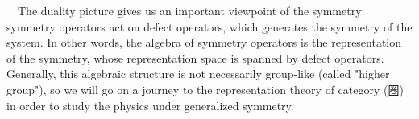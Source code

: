 \documentclass{ltjsarticle}
\theoremstyle{mystyle} %
\numberwithin{equation}{section}
\begin{document}
　The duality picture gives us an important viewpoint of the symmetry: 
symmetry operators act on defect operators, which generates the symmetry of the system. 
In other words, the algebra of symmetry operators is the representation of the symmetry, 
whose representation space is spanned by defect operators. 
Generally, this algebraic structure is not necessarily group-like 
(called "higher group"), 
so we will go on a journey to the representation theory of category (圏) 
in order to study the physics under generalized symmetry. 
\end{document}

